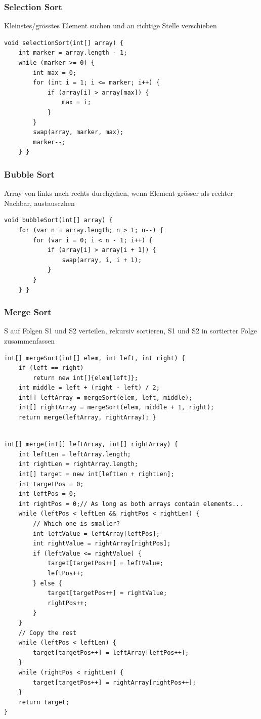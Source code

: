 \begin{multicols*}{4}
		\subsubsection{Selection Sort}
		Kleinstes/grösstes Element suchen und an richtige Stelle verschieben
		
			\begin{lstlisting}
void selectionSort(int[] array) {
	int marker = array.length - 1;
	while (marker >= 0) {
		int max = 0;
		for (int i = 1; i <= marker; i++) {
			if (array[i] > array[max]) {
				max = i;
			}
		}
		swap(array, marker, max);
		marker--;
	} }
			\end{lstlisting}
		
		\subsubsection{Bubble Sort}
		Array von links nach rechts durchgehen, wenn Element grösser als rechter Nachbar, austausczhen
			\begin{lstlisting}
void bubbleSort(int[] array) {
	for (var n = array.length; n > 1; n--) {
		for (var i = 0; i < n - 1; i++) {
			if (array[i] > array[i + 1]) {
				swap(array, i, i + 1);
			}
		}
	} }
			\end{lstlisting}
		
		\subsubsection{Merge Sort}
		S auf Folgen S1 und S2 verteilen, rekursiv sortieren, S1 und S2 in sortierter Folge zusammenfassen
			\begin{lstlisting}
int[] mergeSort(int[] elem, int left, int right) {
	if (left == right)
	  	return new int[]{elem[left]};
	int middle = left + (right - left) / 2;
	int[] leftArray = mergeSort(elem, left, middle);
	int[] rightArray = mergeSort(elem, middle + 1, right);
	return merge(leftArray, rightArray); }
	
\end{lstlisting}
\begin{lstlisting}
int[] merge(int[] leftArray, int[] rightArray) {
	int leftLen = leftArray.length;
	int rightLen = rightArray.length;
	int[] target = new int[leftLen + rightLen];
	int targetPos = 0;
	int leftPos = 0;
	int rightPos = 0;// As long as both arrays contain elements...
	while (leftPos < leftLen && rightPos < rightLen) {
		// Which one is smaller?
		int leftValue = leftArray[leftPos];
		int rightValue = rightArray[rightPos];
		if (leftValue <= rightValue) {
			target[targetPos++] = leftValue;
			leftPos++;
		} else {
			target[targetPos++] = rightValue;
			rightPos++;
		}
	}
    // Copy the rest
	while (leftPos < leftLen) {
		target[targetPos++] = leftArray[leftPos++];
	}
	while (rightPos < rightLen) {
		target[targetPos++] = rightArray[rightPos++];
	}
	return target;
}
			\end{lstlisting}
		

\end{multicols*}

